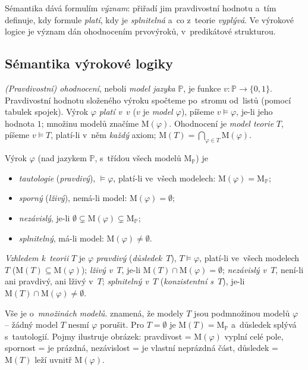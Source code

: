 \documentclass[11pt,a4paper]{article}
\newcommand{\Mset}{\mathrm{M}}              %
\begin{document}
Sémantika dává formulím \emph{význam}: přiřadí jim pravdivostní hodnotu a~tím definuje, kdy formule \emph{platí}, kdy je \emph{splnitelná} a~co z~teorie \emph{vyplývá}. Ve výrokové logice je význam dán ohodnocením prvovýroků, v~predikátové strukturou.

\subsection{Sémantika výrokové logiky}

\begin{definice}
\emph{(Pravdivostní) ohodnocení}, neboli \emph{model jazyka} $\mathbb{P}$, je funkce $v\colon\mathbb{P}\to\{0,1\}$. Pravdivostní hodnotu složeného výroku spočteme po~stromu od~listů (pomocí tabulek spojek). Výrok $\varphi$ \emph{platí v~$v$} ($v$ je \emph{model $\varphi$}), píšeme $v\models\varphi$, je-li jeho hodnota $1$; množinu modelů značíme $\Mset(\varphi)$. Ohodnocení je \emph{model teorie} $T$, píšeme $v\models T$, platí-li v~něm \emph{každý} axiom; $\Mset(T)=\bigcap_{\varphi\in T}\Mset(\varphi)$.
\end{definice}

\begin{definice}
Výrok $\varphi$ (nad jazykem $\mathbb{P}$, s~třídou všech modelů $\Mset_{\mathbb{P}}$) je
\begin{itemize}
  \item \emph{tautologie} (\emph{pravdivý}), $\models\varphi$, platí-li ve~všech modelech: $\Mset(\varphi)=\Mset_{\mathbb{P}}$;
  \item \emph{sporný} (\emph{lživý}), nemá-li model: $\Mset(\varphi)=\emptyset$;
  \item \emph{nezávislý}, je-li $\emptyset\subsetneq\Mset(\varphi)\subsetneq\Mset_{\mathbb{P}}$;
  \item \emph{splnitelný}, má-li model: $\Mset(\varphi)\neq\emptyset$.
\end{itemize}
\emph{Vzhledem k~teorii} $T$ je $\varphi$ \emph{pravdivý} (\emph{důsledek}~$T$), $T\models\varphi$, platí-li ve~všech modelech $T$ ($\Mset(T)\subseteq\Mset(\varphi)$); \emph{lživý v~$T$}, je-li $\Mset(T)\cap\Mset(\varphi)=\emptyset$; \emph{nezávislý v~$T$}, není-li ani pravdivý, ani lživý v~$T$; \emph{splnitelný v~$T$} (\emph{konzistentní s~$T$}), je-li $\Mset(T)\cap\Mset(\varphi)\neq\emptyset$.
\end{definice}

\begin{intuice}
Vše je o~\emph{množinách modelů}.  znamená, že modely $T$ jsou podmnožinou modelů $\varphi$ -- žádný model $T$ nesmí $\varphi$ porušit. Pro $T=\emptyset$ je $\Mset(T)=\Mset_{\mathbb{P}}$ a~důsledek splývá s~tautologií. Pojmy ilustruje obrázek: pravdivost = $\Mset(\varphi)$ vyplní celé pole, spornost = je prázdná, nezávislost = je vlastní neprázdná část, důsledek = $\Mset(T)$ leží uvnitř $\Mset(\varphi)$.
\end{intuice}
\end{document}
